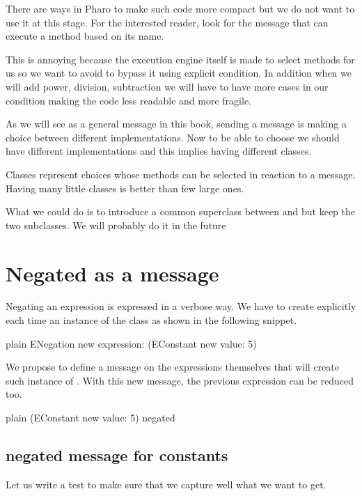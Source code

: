 \documentclass[10pt,twoside,english]{_support/latex/sbabook/sbabook}
\begin{document}
There are ways in Pharo to make such code more compact but we do not want to use it at this stage. For the interested reader, look for the message  that can execute a method based on its name. 

This is annoying because the execution engine itself is made to select methods for us so we want to avoid to bypass it using explicit condition. In addition when we will add power, division, subtraction we will have to have more cases in our condition making the code less
readable and more fragile. 

As we will see as a general message in this book, sending a message is making a choice between different implementations. 
Now to be able to choose we should have different implementations and this implies having different classes. 

\begin{important}
Classes represent choices whose methods can be selected in reaction to a message. Having many little classes is better than few large ones.
\end{important}

What we could do is to introduce a common superclass between  and  but keep the two subclasses. We will probably do it in the future
\section{Negated as a message}
Negating an expression is expressed in a verbose way. We have to create explicitly each time an instance of the class  as shown in the following snippet. 

\begin{displaycode}{plain}
ENegation new expression: (EConstant new value: 5)
\end{displaycode}

We propose to define a message  on the expressions themselves that will create such instance of .
With this new message, the previous expression can be reduced too. 

\begin{displaycode}{plain}
(EConstant new value: 5) negated
\end{displaycode}
\subsection{negated message for constants}
Let us write a test to make sure that we capture well what we want to get. 
\end{document}
